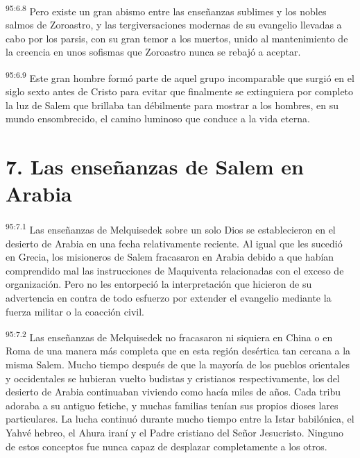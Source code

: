 \par
\textsuperscript{95:6.8} Pero existe un gran abismo entre las enseñanzas sublimes y los nobles salmos de Zoroastro, y las tergiversaciones modernas de su evangelio llevadas a cabo por los parsis, con su gran temor a los muertos, unido al mantenimiento de la creencia en unos sofismas que Zoroastro nunca se rebajó a aceptar.

\par
\textsuperscript{95:6.9} Este gran hombre formó parte de aquel grupo incomparable que surgió en el siglo sexto antes de Cristo para evitar que finalmente se extinguiera por completo la luz de Salem que brillaba tan débilmente para mostrar a los hombres, en su mundo ensombrecido, el camino luminoso que conduce a la vida eterna.

\section*{7. Las enseñanzas de Salem en Arabia}
\par
\textsuperscript{95:7.1} Las enseñanzas de Melquisedek sobre un solo Dios se establecieron en el desierto de Arabia en una fecha relativamente reciente. Al igual que les sucedió en Grecia, los misioneros de Salem fracasaron en Arabia debido a que habían comprendido mal las instrucciones de Maquiventa relacionadas con el exceso de organización. Pero no les entorpeció la interpretación que hicieron de su advertencia en contra de todo esfuerzo por extender el evangelio mediante la fuerza militar o la coacción civil.

\par
\textsuperscript{95:7.2} Las enseñanzas de Melquisedek no fracasaron ni siquiera en China o en Roma de una manera más completa que en esta región desértica tan cercana a la misma Salem. Mucho tiempo después de que la mayoría de los pueblos orientales y occidentales se hubieran vuelto budistas y cristianos respectivamente, los del desierto de Arabia continuaban viviendo como hacía miles de años. Cada tribu adoraba a su antiguo fetiche, y muchas familias tenían sus propios dioses lares particulares. La lucha continuó durante mucho tiempo entre la Istar babilónica, el Yahvé hebreo, el Ahura iraní y el Padre cristiano del Señor Jesucristo. Ninguno de estos conceptos fue nunca capaz de desplazar completamente a los otros.

